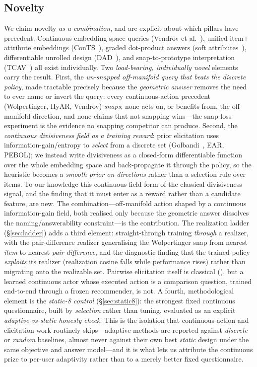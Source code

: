 \documentclass[11pt]{article}
\begin{document}
\subsection{Novelty}\label{sec:novelty}
We claim novelty \emph{as a combination}, and are explicit about which pillars have precedent. Continuous embedding-space
queries (Vendrov et al.~\cite{vendrov20}), unified item$+$attribute embeddings (ConTS~\cite{li21conts}), graded
dot-product answers (soft attributes~\cite{biyik23}), differentiable unrolled design (DAD~\cite{foster21dad}), and
snap-to-prototype interpretation (TCAV~\cite{tcav}) all exist individually. Two \emph{load-bearing, individually novel}
elements carry the result. First, the \emph{un-snapped off-manifold query that beats the discrete policy}, made tractable
precisely because the \emph{geometric answer} removes the need to ever name or invert the query: every continuous-action
precedent (Wolpertinger, HyAR, Vendrov) \emph{snaps}; none acts on, or benefits from, the off-manifold direction, and
none claims that not snapping wins---the snap-loss experiment is the evidence no snapping competitor can produce. Second,
the \emph{continuous divisiveness field as a training reward}: prior elicitation uses information-gain/entropy to
\emph{select} from a discrete set (Golbandi~\cite{golbandi11}, EAR, PEBOL); we instead write divisiveness as a closed-form
differentiable function over the whole embedding space and back-propagate it through the policy, so the heuristic becomes
a \emph{smooth prior on directions} rather than a selection rule over items. To our knowledge this continuous-field form
of the classical divisiveness signal, and the finding that it must enter as a reward rather than a candidate feature, are
new. The combination---off-manifold action shaped by a continuous information-gain field, both realised only because the
geometric answer dissolves the naming/answerability constraint---is the contribution. The realization ladder
(\S\ref{sec:ladder}) adds a third element: straight-through training \emph{through} a realizer, with the
pair-difference realizer generalising the Wolpertinger snap from nearest \emph{item} to nearest \emph{pair
difference}, and the diagnostic finding that the trained policy \emph{exploits} its realizer (realization cosine falls
while performance rises) rather than migrating onto the realizable set. Pairwise elicitation itself is classical
(\cite{toubia04,canal19,jamieson11,yue09duel}), but a learned continuous actor whose executed action is a comparison
question, trained end-to-end through a frozen recommender, is not. A fourth, methodological element is the
\emph{static-8 control} (\S\ref{sec:static8}): the strongest fixed continuous questionnaire, built by \emph{selection}
rather than tuning, evaluated as an explicit \emph{adaptive-vs-static honesty check}. This is the isolation that
continuous-action and elicitation work routinely skips---adaptive methods are reported against \emph{discrete} or
\emph{random} baselines, almost never against their own best \emph{static} design under the same objective and answer
model---and it is what lets us attribute the continuous prize to per-user adaptivity rather than to a merely better fixed
questionnaire.
\end{document}
